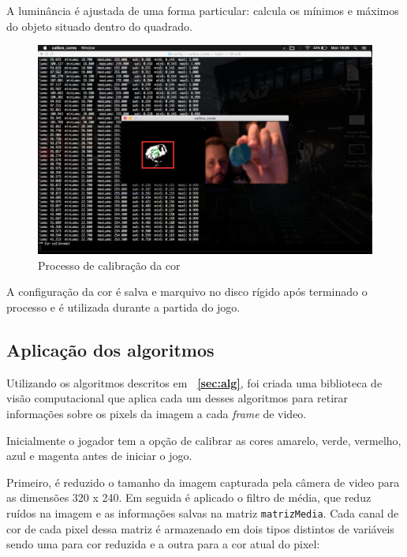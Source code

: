 \documentclass[12pt]{article}
\begin{document}
A lumin\^ancia \'e ajustada de uma forma particular: calcula os m\'inimos e m\'aximos do objeto situado dentro do quadrado.

	\begin{figure}[ht!]
		\begin{center}
			\includegraphics[scale=0.3]{img/calibracor.png}
			\footnotesize \caption{Processo de calibra\c c\~ao da cor }
		\end{center}
	\end{figure}	

A configura\c c\~ao da cor \'e salva e marquivo no disco r\'igido ap\'os terminado o processo e \'e utilizada durante a partida do jogo.

\subsection{Aplica\c c\~ao dos algoritmos}
Utilizando os algoritmos descritos em \textbf{~\ref{sec:alg}}, foi criada uma biblioteca de vis\~ao computacional que aplica cada um desses
algoritmos para retirar informa\c c\~oes sobre os pixels da imagem a cada \emph{frame} de video.

Inicialmente o jogador tem a op\c c\~ao de calibrar as cores amarelo, verde, vermelho, azul e magenta antes de iniciar o jogo.

Primeiro, \'e reduzido o tamanho da imagem capturada pela c\^amera de video para as dimens\~oes 320 x 240.
Em seguida \'e aplicado o filtro de m\'edia, que reduz ru\'idos na imagem e as informa\c c\~oes salvas na matriz \texttt{matrizMedia}.
Cada canal de cor de cada pixel dessa matriz \'e armazenado em dois tipos distintos de vari\'aveis sendo uma para cor reduzida
e a outra para a cor atual do pixel:
\end{document}

